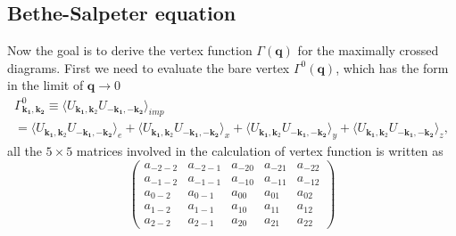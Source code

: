 \documentclass[aps,prb,amsmath,amssymb,footinbib,showpacs,twocolumn]{revtex4-2}
\begin{document}
\begin{widetext}
\section{Bethe-Salpeter equation}
Now the goal is to derive the vertex function $\Gamma(\textbf{q})$ for the maximally crossed diagrams. First we need to evaluate the bare vertex $\Gamma^{0}(\textbf{q})$, which has the form in the limit of $\textbf{q} \to 0 $
\begin{multline}
     \Gamma^{0}_{\mathbf{k_{1},k_{2}}}\equiv \langle U_{\mathbf{k_1},\mathbf{k}_{2}}U_{\mathbf{-k_1},\mathbf{-k_2}}\bigl \rangle_{imp} \\
     = \langle U_{\mathbf{k_1},\mathbf{k}_{2}}U_{\mathbf{-k_1},\mathbf{-k_2}}\bigl \rangle_{e}+\langle U_{\mathbf{k_1},\mathbf{k}_{2}}U_{\mathbf{-k_1},\mathbf{-k_2}}\bigl \rangle_{x}+\langle U_{\mathbf{k_1},\mathbf{k}_{2}}U_{\mathbf{-k_1},\mathbf{-k_2}}\bigl \rangle_{y}+\langle U_{\mathbf{k_1},\mathbf{k}_{2}}U_{\mathbf{-k_1},\mathbf{-k_2}}\bigl \rangle_{z},
\end{multline}
all the $5\times5$ matrices involved in the calculation of vertex function is written as
\begin{equation}
    \begin{pmatrix}
        a_{-2-2} &  a_{-2-1} &  a_{-20} &  a_{-21} & a_{-22} \\
          a_{-1-2} &  a_{-1-1} &  a_{-10} &  a_{-11} & a_{-12} \\
            a_{0-2} &  a_{0-1} &  a_{00} &  a_{01} & a_{02} \\
              a_{1-2} &  a_{1-1} &  a_{10} &  a_{11} & a_{12} \\
               a_{2-2} &  a_{2-1} &  a_{20} &  a_{21} & a_{22}
          \end{pmatrix}
\end{equation}

\end{widetext}
\end{document}
